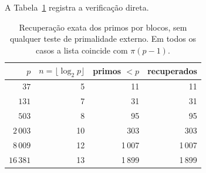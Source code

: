 A Tabela~\ref{tab:crivo} registra a verificação direta.

\begin{table}[htbp]
\centering
\small
\begin{tabular}{rrrr}
\toprule
$p$ & $n=\lfloor\log_2 p\rfloor$ & primos $<p$ & recuperados \\
\midrule
$37$    & 5  & 11   & 11 \\
$131$   & 7  & 31   & 31 \\
$503$   & 8  & 95   & 95 \\
$2\,003$& 10 & 303  & 303 \\
$8\,009$& 12 & 1\,007 & 1\,007 \\
$16\,381$& 13 & 1\,899 & 1\,899 \\
\bottomrule
\end{tabular}
\caption{Recuperação exata dos primos por blocos, sem qualquer teste de
primalidade externo. Em todos os casos a lista coincide com $\pi(p-1)$.}
\label{tab:crivo}
\end{table}
